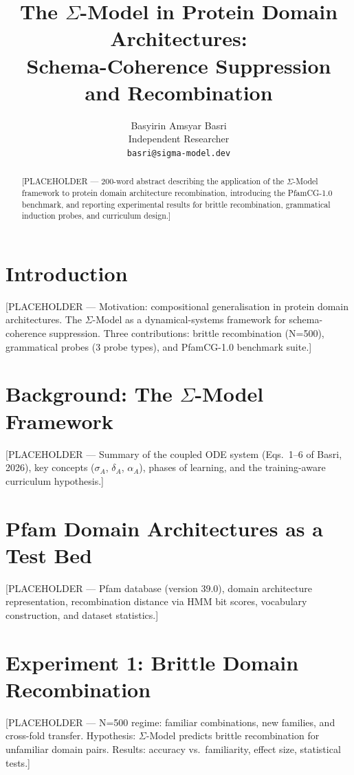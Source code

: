 \documentclass[final]{neurips_2026}
\title{The $\Sigma$-Model in Protein Domain Architectures:\\[2pt]
Schema-Coherence Suppression and Recombination}
\author{
  Basyirin Amsyar Basri \\
  Independent Researcher \\
  \texttt{basri@sigma-model.dev}
}
\begin{document}

\maketitle

\begin{abstract}
[PLACEHOLDER — 200-word abstract describing the application of the
$\Sigma$-Model framework to protein domain architecture recombination,
introducing the PfamCG-1.0 benchmark, and reporting experimental results
for brittle recombination, grammatical induction probes, and curriculum
design.]
\end{abstract}

\section{Introduction}
[PLACEHOLDER — Motivation: compositional generalisation in protein
domain architectures. The $\Sigma$-Model \cite{basri2026sigma} as a
dynamical-systems framework for schema-coherence suppression. Three
contributions: brittle recombination (N=500), grammatical probes
(3 probe types), and PfamCG-1.0 benchmark suite.]

\section{Background: The $\Sigma$-Model Framework}
[PLACEHOLDER — Summary of the coupled ODE system
(Eqs.~1--6 of Basri, 2026), key concepts ($\sigma_A$, $\delta_A$,
$\alpha_A$), phases of learning, and the training-aware curriculum
hypothesis.]

\section{Pfam Domain Architectures as a Test Bed}
[PLACEHOLDER — Pfam database (version 39.0), domain architecture
representation, recombination distance via HMM bit scores, vocabulary
construction, and dataset statistics.]

\section{Experiment 1: Brittle Domain Recombination}
[PLACEHOLDER — N=500 regime: familiar combinations, new families, and
cross-fold transfer. Hypothesis: $\Sigma$-Model predicts brittle
recombination for unfamiliar domain pairs. Results: accuracy vs.\
familiarity, effect size, statistical tests.]
\end{document}
